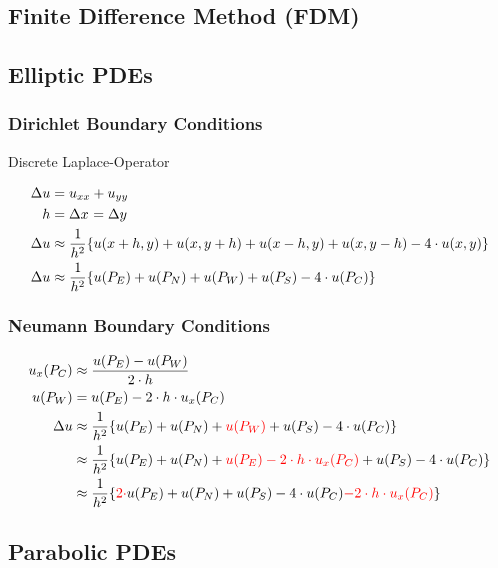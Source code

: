 \documentclass[
	final,
	a4paper,
	oneside,
	parskip=full,
	headings=standardclasses,
	headings=big,
	pointednumbers,
    fleqn
]{scrartcl}
\newcommand{\f}[2]{\frac{#1}{#2}}
\newcommand{\kl}[1]{{\left( #1 \right)}}
\newcommand{\kq}[1]{{\left\{ #1 \right\}}}
\begin{document}
    \subsection*{Finite Difference Method (FDM)}
    \subsection*{Elliptic PDEs}
    \subsubsection*{Dirichlet Boundary Conditions}
    
    Discrete Laplace-Operator

    \begin{align*}
        \Delta u & = u_{xx} + u_{yy} \\
        h        & = \dx = \dy \\
        \Delta u & \approx \f{1}{h^2} \kq{u\kl{x + h, y} + u\kl{x, y + h} + u\kl{x - h, y} + u\kl{x, y - h} - 4 \cdot u\kl{x,y}} \\
        \Delta u & \approx \f{1}{h^2} \kq{u\kl{P_E} + u\kl{P_N} + u\kl{P_W} + u\kl{P_S} - 4 \cdot u\kl{P_C}}
    \end{align*}

    \subsubsection*{Neumann Boundary Conditions}

    \begin{align*}
        u_x\kl{P_C} & \approx \f{u\kl{P_E} - u\kl{P_W}}{2\cdot h} \\
        u\kl{P_W}   & = u\kl{P_E} - 2\cdot h \cdot u_x\kl{P_C} \\
        \Delta u    & \approx \f{1}{h^2} \kq{u\kl{P_E} + u\kl{P_N} + {\color{red}u\kl{P_W}} + u\kl{P_S} - 4 \cdot u\kl{P_C}} \\
                    & \approx \f{1}{h^2} \kq{u\kl{P_E} + u\kl{P_N} + {\color{red}u\kl{P_E} - 2\cdot h \cdot u_x\kl{P_C}} + u\kl{P_S} - 4 \cdot u\kl{P_C}} \\
                    & \approx \f{1}{h^2} \kq{{\color{red}2\cdot}u\kl{P_E} + u\kl{P_N} + u\kl{P_S} - 4 \cdot u\kl{P_C} {\color{red} - 2\cdot h \cdot u_x\kl{P_C}}} \\
    \end{align*}
    
    \subsection*{Parabolic PDEs}
\end{document}

